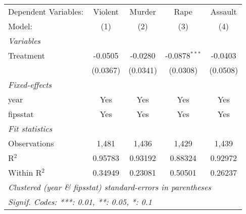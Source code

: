 \begingroup
\centering
\begin{tabular}{lcccc}
   \tabularnewline \midrule \midrule
   Dependent Variables: & Violent  & Murder   & Rape            & Assault\\  
   Model:               & (1)      & (2)      & (3)             & (4)\\  
   \midrule
   \emph{Variables}\\
   Treatment            & -0.0505  & -0.0280  & -0.0878$^{***}$ & -0.0403\\   
                        & (0.0367) & (0.0341) & (0.0308)        & (0.0508)\\   
   \midrule
   \emph{Fixed-effects}\\
   year                 & Yes      & Yes      & Yes             & Yes\\  
   fipsstat             & Yes      & Yes      & Yes             & Yes\\  
   \midrule
   \emph{Fit statistics}\\
   Observations         & 1,481    & 1,436    & 1,429           & 1,439\\  
   R$^2$                & 0.95783  & 0.93192  & 0.88324         & 0.92972\\  
   Within R$^2$         & 0.34949  & 0.23081  & 0.50501         & 0.26237\\  
   \midrule \midrule
   \multicolumn{5}{l}{\emph{Clustered (year \& fipsstat) standard-errors in parentheses}}\\
   \multicolumn{5}{l}{\emph{Signif. Codes: ***: 0.01, **: 0.05, *: 0.1}}\\
\end{tabular}
\par\endgroup


